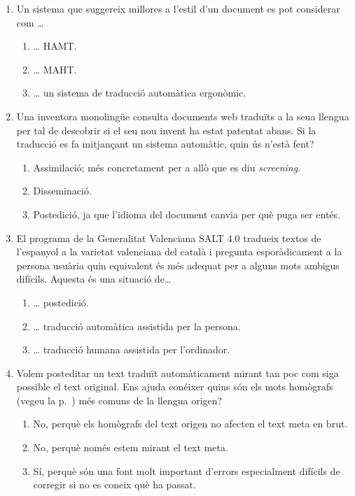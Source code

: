 \begin{enumerate}
\item Un sistema que suggereix millores a l'estil d'un document es pot
  considerar com {\ldots}
  \begin{enumerate}
  \item {\ldots} HAMT.
  \item {\ldots} MAHT.
  \item {\ldots} un sistema de traducció automàtica ergonòmic.
\end{enumerate}

\item Una inventora monolingüe consulta documents web traduïts a la
  seua llengua per tal de descobrir si el seu nou invent ha estat
  patentat abans. Si la traducció es fa mitjançant un sistema
  automàtic, quin ús n'està fent?
  \begin{enumerate}
  \item Assimilació; més concretament per a allò que es diu
    \emph{screening}.
  \item Disseminació.
  \item Postedició, ja que l'idioma del document canvia per què puga
    ser entés.
  \end{enumerate}

\item El programa de la Generalitat Valenciana SALT 4.0 tradueix
  textos de l'espanyol a la varietat valenciana del català i pregunta
  esporàdicament a la persona usuària quin equivalent és més adequat
  per a alguns mots ambigus difícils.  Aquesta és una situació
  de{\ldots}
  \begin{enumerate}
  \item {\ldots} postedició.
  \item {\ldots} traducció automàtica assistida per la persona.
  \item {\ldots} traducció humana assistida per l'ordinador.
  \end{enumerate}

\item Volem posteditar un text traduït automàticament mirant tan poc
  com siga possible el text original. Ens ajuda conéixer quins són els
  mots homògrafs (vegeu la p.~\pageref{pg:homografia}) més comuns de
  la llengua origen?
  \begin{enumerate}
  \item No, perquè els homògrafs del text origen no afecten el text
    meta en brut.
  \item No, perquè només estem mirant el text meta.
  \item Sí, perquè són una font molt important d'errors especialment
    difícils de corregir si no es coneix què ha passat.
  \end{enumerate}


\end{enumerate}
